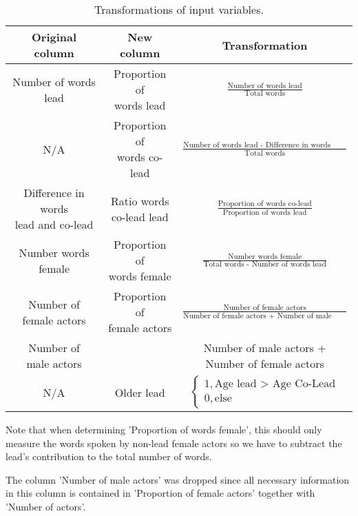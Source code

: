 \documentclass{article}
\begin{document}
\begin{table}[h!]
	\centering
	\begin{tabular}{ccc}
		Original column & New column & Transformation \\
		\midrule
		Number of words lead & \makecell{Proportion of \\ words lead} & $\frac{\text{Number of words lead}}{\text{Total words}}$ \\
		N/A & \makecell{Proportion of \\ words co-lead} & $\frac{\text{Number of words lead - Difference in words lead and co-lead}}{\text{Total words}}$ \\
		\makecell{Difference in words \\ lead and co-lead} & \makecell{Ratio words \\ co-lead lead} & $\frac{\text{Proportion of words co-lead}}{\text{Proportion of words lead}}$ \\
		Number words female & \makecell{Proportion of \\ words female} & $\frac{\text{Number words female}}{\text{Total words - Number of words lead}}$ \\
		\makecell{Number of \\ female actors} & \makecell{Proportion of \\ female actors} & $\frac{\text{Number of female actors}}{\text{Number of female actors + Number of male actos}}$ \\
		\makecell{Number of \\ male actors} & \makecell{Number of actors} & \makecell{Number of male actors + \\ Number of female actors} \\
		N/A & Older lead & $\begin{cases} 1, \text{Age lead > Age Co-Lead} \\ 0, \text{else} \end{cases}$
	\end{tabular}
	\caption{Transformations of input variables.}
	\label{tab:transformations}
\end{table}

Note that when determining 'Proportion of words female', this should only measure the words spoken by non-lead female actors so we have to subtract the lead's contribution to the total number of words.

The column 'Number of male actors' was dropped since all necessary information in this column is contained in 'Proportion of female actors' together with 'Number of actors'.
\end{document}
